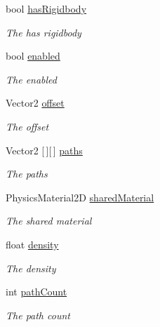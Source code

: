 \begin{DoxyCompactItemize}
\item 
bool \hyperlink{class_serialize_polygon_collider2_d_1_1_stored_information_a1c7a606654c0a015b39ebe831647bbfb}{has\+Rigidbody}
\begin{DoxyCompactList}\small\item\em The has rigidbody \end{DoxyCompactList}\item 
bool \hyperlink{class_serialize_polygon_collider2_d_1_1_stored_information_afe7b2bc01573d6b094b5300bcfbbf787}{enabled}
\begin{DoxyCompactList}\small\item\em The enabled \end{DoxyCompactList}\item 
Vector2 \hyperlink{class_serialize_polygon_collider2_d_1_1_stored_information_a828b444f983866b61ce86adca9f98763}{offset}
\begin{DoxyCompactList}\small\item\em The offset \end{DoxyCompactList}\item 
Vector2 \mbox{[}$\,$\mbox{]}\mbox{[}$\,$\mbox{]} \hyperlink{class_serialize_polygon_collider2_d_1_1_stored_information_aef277db9e98a3f1572925edd52bbdaaa}{paths}
\begin{DoxyCompactList}\small\item\em The paths \end{DoxyCompactList}\item 
Physics\+Material2D \hyperlink{class_serialize_polygon_collider2_d_1_1_stored_information_a3bde1275cddf18a2b9d7a53a2d9d9ace}{shared\+Material}
\begin{DoxyCompactList}\small\item\em The shared material \end{DoxyCompactList}\item 
float \hyperlink{class_serialize_polygon_collider2_d_1_1_stored_information_a73a544fecaed039a5b45916b3480804f}{density}
\begin{DoxyCompactList}\small\item\em The density \end{DoxyCompactList}\item 
int \hyperlink{class_serialize_polygon_collider2_d_1_1_stored_information_a5a5b7f72e7e5ce39cd283a8e8a1d601e}{path\+Count}
\begin{DoxyCompactList}\small\item\em The path count \end{DoxyCompactList}\end{DoxyCompactItemize}


